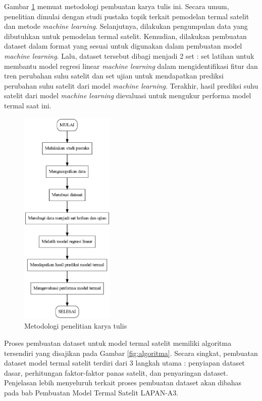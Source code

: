 Gambar \ref{fig:metodologi} memuat metodologi pembuatan karya tulis ini. Secara
umum, penelitian dimulai dengan studi pustaka topik terkait pemodelan termal
satelit dan metode \textit{machine learning}. Selanjutnya, dilakukan
pengumpulan data yang dibutuhkan untuk pemodelan termal satelit. Kemudian,
dilakukan pembuatan dataset dalam format yang sesuai untuk digunakan dalam
pembuatan model \textit{machine learning}. Lalu, dataset tersebut dibagi
menjadi 2 set : set latihan untuk membantu model regresi linear \textit{machine
learning} dalam mengidentifikasi fitur dan tren perubahan suhu satelit dan set
ujian untuk mendapatkan prediksi perubahan suhu satelit dari model
\textit{machine learning}. Terakhir, hasil prediksi suhu satelit dari model
\textit{machine learning} dievaluasi untuk mengukur performa model termal saat ini.

\begin{figure}[H]
\setlength{}
\begin{center}
\includegraphics[width=0.4\textwidth]{fig/graph_metodologi.png}
\caption{Metodologi penelitian karya tulis}
\label{fig:metodologi}
\end{center}
\end{figure}

Proses pembuatan dataset untuk model termal satelit memiliki algoritma
tersendiri yang disajikan pada Gambar \ref{fig:algoritma}. Secara singkat,
pembuatan dataset model termal satelit terdiri dari 3 langkah utama : penyiapan
dataset dasar, perhitungan faktor-faktor panas satelit, dan penyaringan
dataset. Penjelasan lebih menyeluruh terkait proses pembuatan dataset akan
dibahas pada bab Pembuatan Model Termal Satelit LAPAN-A3.

